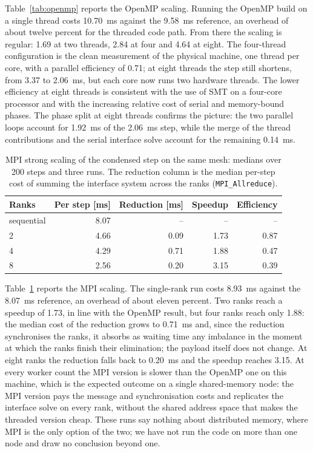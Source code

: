 \documentclass[11pt,a4paper]{article}
\begin{document}
Table~\ref{tab:openmp} reports the OpenMP scaling. Running the OpenMP build
on a single thread costs 10.70~ms against the 9.58~ms reference, an
overhead of about twelve percent for the threaded code path. From there the
scaling is regular: 1.69 at two threads, 2.84 at four and 4.64 at eight.
The four-thread configuration is the clean measurement of the physical
machine, one thread per core, with a parallel efficiency of 0.71; at eight
threads the step still shortens, from 3.37 to 2.06~ms, but each core now
runs two hardware threads. The lower efficiency at eight threads is
consistent with the use of SMT on a four-core processor and with the
increasing relative cost of serial and memory-bound phases. The phase split
at eight threads confirms the picture: the two parallel loops account for
1.92~ms of the 2.06~ms step, while the merge of the thread contributions
and the serial interface solve account for the remaining 0.14~ms.

\begin{table}[htbp]
\centering
\begin{tabular}{lrrrr}
\hline
Ranks & Per step [ms] & Reduction [ms] & Speedup & Efficiency \\
\hline
sequential & 8.07 & --   & --   & --   \\
2          & 4.66 & 0.09 & 1.73 & 0.87 \\
4          & 4.29 & 0.71 & 1.88 & 0.47 \\
8          & 2.56 & 0.20 & 3.15 & 0.39 \\
\hline
\end{tabular}
\caption{\footnotesize MPI strong scaling of the condensed step on the same
mesh: medians over 200 steps and three runs. The reduction column is the
median per-step cost of summing the interface system across the ranks
(\texttt{MPI\_Allreduce}).}
\label{tab:mpi}
\end{table}

Table~\ref{tab:mpi} reports the MPI scaling. The single-rank run costs
8.93~ms against the 8.07~ms reference, an overhead of about eleven percent.
Two ranks reach a speedup of 1.73, in line with the OpenMP result, but four
ranks reach only 1.88: the median cost of the reduction grows to 0.71~ms
and, since the reduction synchronises the ranks, it absorbs as waiting time
any imbalance in the moment at which the ranks finish their elimination;
the payload itself does not change. At eight ranks the reduction falls back
to 0.20~ms and the speedup reaches 3.15. At every worker count the MPI
version is slower than the OpenMP one on this machine, which is the
expected outcome on a single shared-memory node: the MPI version pays the
message and synchronisation costs and replicates the interface solve on
every rank, without the shared address space that makes the threaded
version cheap. These runs say nothing about distributed memory, where MPI
is the only option of the two; we have not run the code on more than one
node and draw no conclusion beyond one.
\end{document}
